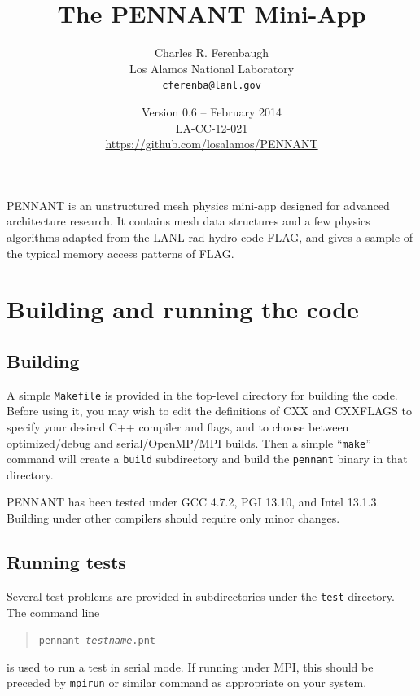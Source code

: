 \documentclass[11pt,letterpaper]{article}
\begin{document}
\title{The PENNANT Mini-App}
\author{Charles R. Ferenbaugh \\
        Los Alamos National Laboratory \\
        {\tt cferenba@lanl.gov}}
\date{Version 0.6 -- February 2014 \\
      LA-CC-12-021 \\
      \url{https://github.com/losalamos/PENNANT}}
\maketitle

PENNANT is an unstructured mesh physics mini-app designed for advanced
architecture research.
It contains mesh data structures and a few physics algorithms adapted
from the LANL rad-hydro code FLAG, and gives a
sample of the typical memory access patterns of FLAG.


\section{Building and running the code}

\subsection{Building}

A simple {\tt Makefile} is provided in the top-level directory for building
the code.  Before using it, you may wish to edit the definitions of CXX
and CXXFLAGS to specify your desired C++ compiler and flags, and to
choose between optimized/debug and serial/OpenMP/MPI builds.  Then
a simple ``{\tt make}'' command will create a {\tt build} subdirectory and
build the {\tt pennant} binary in that directory.

PENNANT has been tested under GCC 4.7.2, PGI 13.10, and Intel 13.1.3.
Building under other compilers should require only minor changes.

\subsection{Running tests}

Several test problems are provided in subdirectories under the {\tt test}
directory.  The command line
\begin{quote}
{\tt pennant \emph{testname}.pnt}
\end{quote}
is used to run a test in serial mode.  If running under MPI, this should
be preceded by {\tt mpirun} or similar command as appropriate on your
system.
\end{document}
